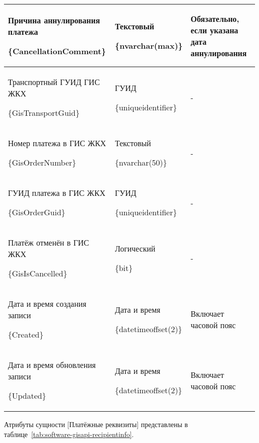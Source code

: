 \begin{myTable}
\begin{longtable}[h]{|p{}|p{}|p{}|}
	Причина аннулирования платежа \par \{CancellationComment\} & Текстовый \par \{nvarchar(max)\} & Обязательно, если указана дата аннулирования \\ \hline
	Транспортный ГУИД ГИС ЖКХ \par \{GisTransportGuid\} & ГУИД \par \{uniqueidentifier\} & - \\ \hline
	Номер платежа в ГИС ЖКХ \par \{GisOrderNumber\} & Текстовый \par \{nvarchar(50)\} & - \\ \hline
	ГУИД платежа в ГИС ЖКХ \par \{GisOrderGuid\} & ГУИД \par \{uniqueidentifier\} & - \\ \hline
	Платёж отменён в ГИС ЖКХ \par \{GisIsCancelled\} & Логический \par \{bit\} & - \\ \hline
	Дата и время создания записи \par \{Created\} & Дата и время \par \{datetimeoffset(2)\} & Включает часовой пояс \\ \hline
	Дата и время обновления записи \par \{Updated\} & Дата и время \par \{datetimeoffset(2)\} & Включает часовой пояс \\ \hline
\end{longtable}
\end{myTable}

Атрибуты сущности [Платёжные реквизиты] представлены в таблице~\ref{tab:software-gisapi-recipientinfo}.

